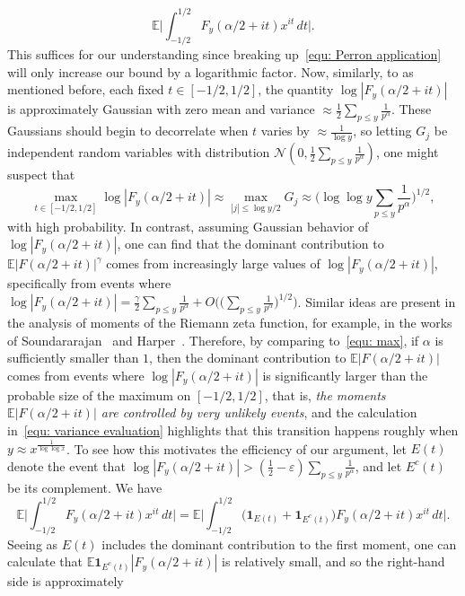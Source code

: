 \documentclass[12pt,a4paper,reqno]{amsart}
\numberwithin{equation}{section}
\def\E{\mathbb E}
\def\leq {\leqslant}
\theoremstyle{remark}
\theoremstyle{definition}
\numberwithin{equation}{section}
\theoremstyle{remark}
\def\E{\mathbb E}
\begin{document}
\[
\E \biggl| \int_{-1/2}^{1/2} F_y (\alpha/2 + it) x^{it} \, dt \biggr|.
\]
This suffices for our understanding since breaking up~\eqref{equ: Perron application} will only increase our bound by a logarithmic factor. Now, similarly, to as mentioned before, each fixed $t \in [-1/2, 1/2]$, the quantity $\log| F_y (\alpha/2 + it)|$ is approximately Gaussian with zero mean and variance $\approx \frac{1}{2} \sum_{p \leq y} \frac{1}{p^{\alpha}}$. These Gaussians should begin to decorrelate when $t$ varies by $\approx \frac{1}{\log y}$, so letting $G_j$ be independent random variables with distribution $\mathcal{N}(0, \frac{1}{2} \sum_{p \leq y} \frac{1}{p^{\alpha}})$, one might suspect that
\begin{equation}\label{equ: max}
\max_{t \in [-1/2, 1/2]} \log |F_y (\alpha / 2 + it)| \approx \max_{|j| \leq \log y/2} G_j \approx \biggl( \log \log y \sum_{p \leq y} \frac{1}{p^{\alpha}} \biggr)^{1/2} ,
\end{equation}
with high probability. In contrast, assuming Gaussian behavior of $\log |F_y (\alpha/2 + it)|$, one can find that the dominant contribution to $ \E |F(\alpha / 2 + it )|^\gamma$ comes from increasingly large values of $\log |F_y (\alpha / 2 + it)|$, specifically from events where $\log |F_y (\alpha / 2 + it)| = \frac{\gamma}{2} \sum_{p \leq y} \frac{1}{p^{\alpha}} + O \bigl(\bigl( \sum_{p \leq y} \frac{1}{p^{\alpha}} \bigr)^{1/2} \bigr)$. Similar ideas are present in the analysis of moments of the Riemann zeta function, for example, in the works of Soundararajan~\cite{SoundMoment} and Harper~\cite{harper2013sharp}. Therefore, by comparing to~\eqref{equ: max}, if $\alpha$ is sufficiently smaller than $1$, then the dominant contribution to $\E |F(\alpha/2 + it)|$ comes from events where $\log |F_y (\alpha / 2 + it)|$ is significantly larger than the probable size of the maximum on $[-1/2, 1/2]$, that is, \textit{the moments $\E |F(\alpha/2 + it)|$ are controlled by very unlikely events}, and the calculation in~\eqref{equ: variance evaluation} highlights that this transition happens roughly when $y \approx x^{\frac{1}{\log \log x}}$. To see how this motivates the efficiency of our argument, let $E(t)$ denote the event that $\log |F_y (\alpha/2 + it)| > (\frac{1}{2} - \varepsilon) \sum_{p \leq y} \frac{1}{p^{\alpha}}$, and let $E^c (t)$ be its complement. We have
\[
\E \biggl| \int_{-1/2}^{1/2} F_y (\alpha/2 + it) x^{it} \, dt \biggr| = \E \biggl| \int_{-1/2}^{1/2} \bigl( \mathbf{1}_{E(t)} + \mathbf{1}_{E^c (t)} \bigr) F_y (\alpha/2 + it) x^{it} \, dt \biggr|.
\]
Seeing as $E(t)$ includes the dominant contribution to the first moment, one can calculate that $\E \mathbf{1}_{E^c (t)} |F_y (\alpha / 2 + it)|$ is relatively small, and so the right-hand side is approximately
\end{document}
